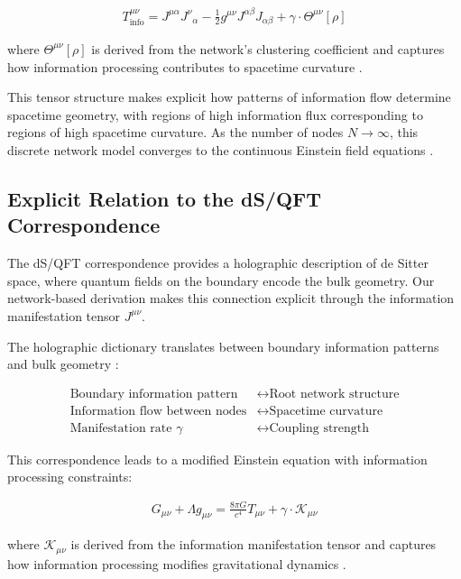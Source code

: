 \documentclass[11pt,english,twoside]{article}
\theoremstyle{plain}
\theoremstyle{definition}
\theoremstyle{remark}
\newcommand{\gammaR}{\gamma}
\begin{document}
\begin{align}
T^{\mu\nu}_{\text{info}} = J^{\mu\alpha}J^{\nu}{}_{\alpha} - \frac{1}{2}g^{\mu\nu}J^{\alpha\beta}J_{\alpha\beta} + \gammaR \cdot \Theta^{\mu\nu}[\rho]
\end{align}

where $\Theta^{\mu\nu}[\rho]$ is derived from the network's clustering coefficient and captures how information processing contributes to spacetime curvature \cite{Bianconi2021}.

This tensor structure makes explicit how patterns of information flow determine spacetime geometry, with regions of high information flux corresponding to regions of high spacetime curvature. As the number of nodes $N \to \infty$, this discrete network model converges to the continuous Einstein field equations \cite{Albert2002}.

\subsection{Explicit Relation to the dS/QFT Correspondence}

The dS/QFT correspondence provides a holographic description of de Sitter space, where quantum fields on the boundary encode the bulk geometry. Our network-based derivation makes this connection explicit through the information manifestation tensor $J^{\mu\nu}$.

The holographic dictionary translates between boundary information patterns and bulk geometry \cite{Pastawski2015}:

\begin{align}
\text{Boundary information pattern} &\longleftrightarrow \text{Root network structure}\\
\text{Information flow between nodes} &\longleftrightarrow \text{Spacetime curvature}\\
\text{Manifestation rate $\gammaR$} &\longleftrightarrow \text{Coupling strength}
\end{align}

This correspondence leads to a modified Einstein equation with information processing constraints:

\begin{align}
G_{\mu\nu} + \Lambda g_{\mu\nu} = \frac{8\pi G}{c^4} T_{\mu\nu} + \gammaR \cdot \mathcal{K}_{\mu\nu}
\end{align}

where $\mathcal{K}_{\mu\nu}$ is derived from the information manifestation tensor and captures how information processing modifies gravitational dynamics \cite{Hartnett2020}.
\end{document}
